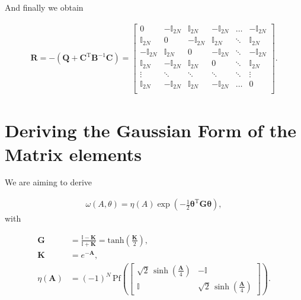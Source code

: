 \documentclass{article}
\begin{document}
And finally we obtain

\begin{align}
	\boldsymbol{R}=-\left(\boldsymbol{Q + \boldsymbol{C}^{\mathrm{T}  }}\boldsymbol{B}^{-1}\boldsymbol{C}  \right)= 
		\begin{bmatrix}
			 0 & -\mathbb{I}_{2N} & \mathbb{I}_{2N} & -\mathbb{I}_{2N} &\dots & -\mathbb{I}_{2N} \\
			 \mathbb{I}_{2N} & 0 & -\mathbb{I}_{2N} & \mathbb{I}_{2N} & \ddots & \mathbb{I}_{2N} \\
			 -\mathbb{I}_{2N} & \mathbb{I}_{2N} & 0 & -\mathbb{I}_{2N} &\ddots & -\mathbb{I}_{2N} \\
			 \mathbb{I}_{2N} & -\mathbb{I}_{2N} & \mathbb{I}_{2N} & 0 & \ddots & \mathbb{I}_{2N} \\
			 \vdots &\ddots & \ddots &\ddots & \ddots & \vdots \\
			 \mathbb{I}_{2N} & -\mathbb{I}_{2N} & \mathbb{I}_{2N} & -\mathbb{I}_{2N} & \dots & 0 \\
		\end{bmatrix}.
\end{align}





\section{Deriving the Gaussian Form of the Matrix elements \label{gaussian}}


We are aiming to derive




\begin{align}
	\omega \left(A, \theta\right) = \eta(A) \exp \left( -\frac{1}{2}\boldsymbol{\theta}^\mathrm{T} \boldsymbol{G}\boldsymbol{\theta}    \right),
\end{align}
with


\begin{align}
	\boldsymbol{G}
	&= \frac{\mathbb{I} - \boldsymbol{K}}{\mathbb{I} + \boldsymbol{K}} = \mathrm{tanh} \left(\frac{\boldsymbol{K}}{2} \right) , \\[4pt]
	\boldsymbol{K}
	&= e^{-\boldsymbol{A}}, \\[4pt]
	\eta(\boldsymbol{A} )
	&= (-1)^N \,\mathrm{Pf}\!\left(
	\begin{bmatrix}
		\sqrt{2}\,\sinh\!\left(\frac{\boldsymbol{A}}{4}\right) & -\mathbb{I} \\
		\mathbb{I} & \sqrt{2}\,\sinh\!\left(\frac{\boldsymbol{A}}{4}\right)
	\end{bmatrix}
	\right).
	\label{krel}
\end{align}
\end{document}

